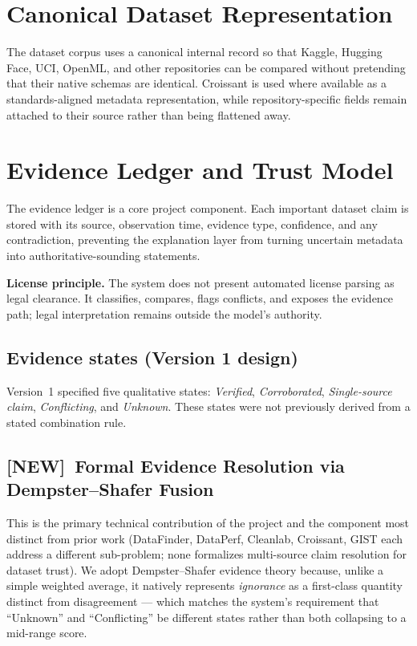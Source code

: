 \documentclass[11pt]{article}
\newcommand{\newtag}{\textcolor{accent}{\textbf{[NEW]}}\ }
\begin{document}
\section{Canonical Dataset Representation}
The dataset corpus uses a canonical internal record so that Kaggle, Hugging Face, UCI, OpenML, and other
repositories can be compared without pretending that their native schemas are identical. Croissant is used
where available as a standards-aligned metadata representation, while repository-specific fields remain
attached to their source rather than being flattened away.

\section{Evidence Ledger and Trust Model}
The evidence ledger is a core project component. Each important dataset claim is stored with its source,
observation time, evidence type, confidence, and any contradiction, preventing the explanation layer from
turning uncertain metadata into authoritative-sounding statements.

\textbf{License principle.} The system does not present automated license parsing as legal clearance. It
classifies, compares, flags conflicts, and exposes the evidence path; legal interpretation remains outside
the model's authority.

\subsection{Evidence states (Version 1 design)}
Version~1 specified five qualitative states: \emph{Verified}, \emph{Corroborated}, \emph{Single-source
claim}, \emph{Conflicting}, and \emph{Unknown}. These states were not previously derived from a stated
combination rule.

\subsection{\newtag Formal Evidence Resolution via Dempster--Shafer Fusion}
\label{sec:resolver}

This is the primary technical contribution of the project and the component most distinct from prior work
(DataFinder, DataPerf, Cleanlab, Croissant, GIST each address a different sub-problem; none formalizes
multi-source claim resolution for dataset trust). We adopt Dempster--Shafer evidence theory
\cite{shafer1976,dempster1968} because, unlike a simple weighted average, it natively represents
\emph{ignorance} as a first-class quantity distinct from disagreement --- which matches the system's
requirement that ``Unknown'' and ``Conflicting'' be different states rather than both collapsing to a
mid-range score.
\end{document}
